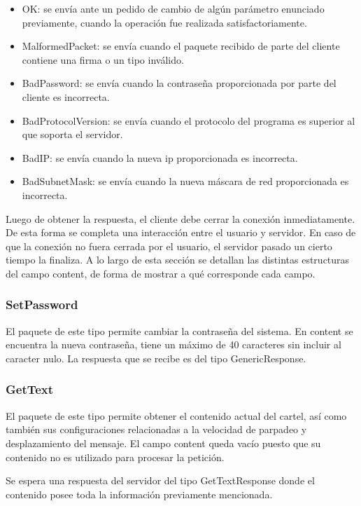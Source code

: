 \begin{itemize}
	\item OK: se envía ante un pedido de cambio de algún parámetro enunciado previamente, cuando la operación fue realizada satisfactoriamente.
	\item MalformedPacket: se envía cuando el paquete recibido de parte del cliente contiene una firma o un tipo inválido.
	\item BadPassword: se envía cuando la contraseña proporcionada por parte del cliente es incorrecta.
	\item BadProtocolVersion: se envía cuando el protocolo del programa es superior al que soporta el servidor.
	\item BadIP: se envía cuando la nueva ip proporcionada es incorrecta.
	\item BadSubnetMask: se envía cuando la nueva máscara de red proporcionada es incorrecta.
\end{itemize}

Luego de obtener la respuesta, el cliente debe cerrar la conexión inmediatamente.
De esta forma se completa una interacción entre el usuario y servidor.
En caso de que la conexión no fuera cerrada por el usuario, el servidor pasado un cierto tiempo la finaliza.
A lo largo de esta sección se detallan las distintas estructuras del campo content, de forma de mostrar a qué corresponde cada campo.



\subsubsection{SetPassword}

El paquete de este tipo permite cambiar la contraseña del sistema.
En content se encuentra la nueva contraseña, tiene un máximo de 40 caracteres sin incluir al caracter nulo.
La respuesta que se recibe es del tipo GenericResponse.



\subsubsection{GetText}

El paquete de este tipo permite obtener el contenido actual del cartel, así como también sus configuraciones relacionadas a la velocidad de parpadeo y desplazamiento del mensaje.
El campo content queda vacío puesto que su contenido no es utilizado para procesar la petición.

Se espera una respuesta del servidor del tipo GetTextResponse donde el contenido posee toda la información previamente mencionada.



